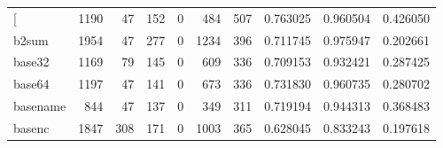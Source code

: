 \begin{longtable}{lrrrrrrrrr}
\bottomrule
\endlastfoot
{[}         &                                1190 &                                              47 &                                            152 &                                             0 &                                            484 &                                          507 &                                           0.763025 &                               0.960504 &                             0.426050 \\
b2sum     &                                1954 &                                              47 &                                            277 &                                             0 &                                           1234 &                                          396 &                                           0.711745 &                               0.975947 &                             0.202661 \\
base32    &                                1169 &                                              79 &                                            145 &                                             0 &                                            609 &                                          336 &                                           0.709153 &                               0.932421 &                             0.287425 \\
base64    &                                1197 &                                              47 &                                            141 &                                             0 &                                            673 &                                          336 &                                           0.731830 &                               0.960735 &                             0.280702 \\
basename  &                                 844 &                                              47 &                                            137 &                                             0 &                                            349 &                                          311 &                                           0.719194 &                               0.944313 &                             0.368483 \\
basenc    &                                1847 &                                             308 &                                            171 &                                             0 &                                           1003 &                                          365 &                                           0.628045 &                               0.833243 &                             0.197618 \\

\end{longtable}
